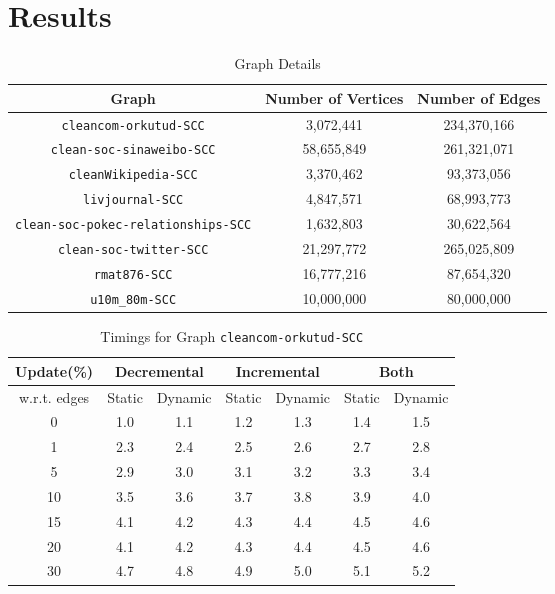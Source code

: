 \section{Results}\label{Sec: Results}
\blindtext

\begin{table}[H]
    \centering
    \caption{Graph Details}
    \begin{tabular}{|c|c|c|}
        \hline
        \textbf{Graph} & \textbf{Number of Vertices} & \textbf{Number of Edges} \\
        \hline
        \texttt{cleancom-orkutud-SCC} & 3,072,441 & 234,370,166 \\
        \texttt{clean-soc-sinaweibo-SCC} & 58,655,849 & 261,321,071 \\
        \texttt{cleanWikipedia-SCC} & 3,370,462 & 93,373,056 \\
        \texttt{livjournal-SCC} & 4,847,571 & 68,993,773 \\
        \texttt{clean-soc-pokec-relationships-SCC} & 1,632,803 & 30,622,564 \\
        \texttt{clean-soc-twitter-SCC} & 21,297,772 & 265,025,809 \\
        \texttt{rmat876-SCC} & 16,777,216 & 87,654,320 \\
        \texttt{u10m\_80m-SCC} & 10,000,000 & 80,000,000 \\
        \hline
    \end{tabular}
    \label{tab:graph_details}
\end{table}


\begin{table}[H]
    \centering
    \caption{Timings for Graph \texttt{cleancom-orkutud-SCC} }
    \begin{tabular}{|c|c|c|c|c|c|c|}
        \hline
        \textbf{Update(\%)} & \multicolumn{2}{c|}{\textbf{Decremental}} & \multicolumn{2}{c|}{\textbf{Incremental}} & \multicolumn{2}{c|}{\textbf{Both}} \\
        \hline
        w.r.t. edges & Static &  Dynamic & Static & Dynamic & Static & Dynamic \\
        \hline
        0 & 1.0 & 1.1 & 1.2 & 1.3 & 1.4 & 1.5 \\
        1 & 2.3 & 2.4 & 2.5 & 2.6 & 2.7 & 2.8 \\
        5 & 2.9 & 3.0 & 3.1 & 3.2 & 3.3 & 3.4 \\
        10 & 3.5 & 3.6 & 3.7 & 3.8 & 3.9 & 4.0 \\
        15 & 4.1 & 4.2 & 4.3 & 4.4 & 4.5 & 4.6 \\
        20 & 4.1 & 4.2 & 4.3 & 4.4 & 4.5 & 4.6 \\
        30 & 4.7 & 4.8 & 4.9 & 5.0 & 5.1 & 5.2 \\
        \hline
    \end{tabular}
    \label{tab:timed_results_g1}
\end{table}

